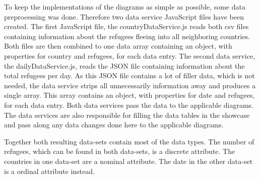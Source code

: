 

To keep the implementations of the diagrams as simple as possible, some data preprocessing was done. Therefore two data service JavaScript files have been created. The first JavaScript file, the countryDataService.js reads both csv files containing information about the refugees fleeing into all neighboring countries. Both files are then combined to one data array containing an object, with properties for country and refugees, for each data entry. The second data service, the dailyDataService.js, reads the JSON file containing information about the total refugees per day. As this JSON file contains a lot of filler data, which is not needed, the data service strips all unnecessarily information away and produces a single array. This array contains an object, with properties for date and refugees, for each data entry. Both data services pass the data to the applicable diagrams. The data services are also responsible for filling the data tables in the showcase and pass along any data changes done here to the applicable diagrams.


Together both resulting data-sets contain most of the data types. The number of refugees, which can be found in both data-sets, is a discrete attribute. The countries in one data-set are a nominal attribute. The date in the other data-set is a ordinal attribute instead.






